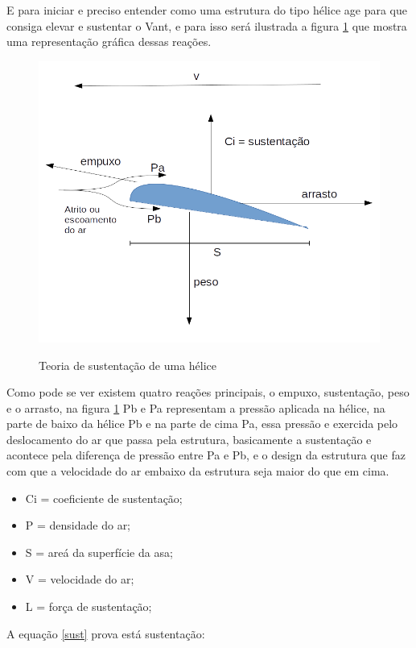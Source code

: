 E para iniciar e preciso entender como uma estrutura do tipo hélice age para que consiga elevar e sustentar o Vant, e para isso será ilustrada a figura \ref{fig:asa} que mostra uma representação gráfica dessas reações. 

\begin{figure}[htpb]
  \centering
  \caption{Teoria de sustentação de uma hélice}
  \includegraphics[scale=.4]{figs/helice.png}
  \label{fig:asa}
\end{figure}

Como pode se ver existem quatro reações principais, o empuxo, sustentação, peso e o arrasto, na figura \ref{fig:asa} Pb e Pa representam a pressão aplicada na hélice, na  parte de baixo da hélice Pb e na parte de cima Pa, essa pressão e exercida pelo deslocamento do ar que passa pela estrutura, basicamente a sustentação e acontece pela diferença de pressão entre Pa e Pb, e o design da estrutura que faz com que a velocidade do ar embaixo da estrutura seja maior do que em cima.

\begin{itemize}
    \item Ci = coeficiente de sustentação;
    \item P = densidade do ar; 
    \item S = areá da superfície da asa;
    \item V = velocidade do ar; 
    \item L = força de sustentação;
\end{itemize}{}
A equação \ref{sust} prova está sustentação: 

